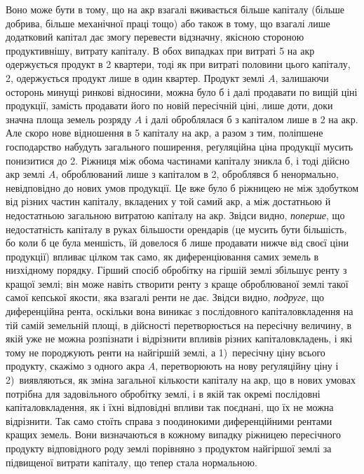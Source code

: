 \parcont{}  %
Воно може бути в тому, що на акр взагалі вживається більше капіталу (більше
добрива, більше механічної праці тощо) або також в тому, що взагалі лише
додатковий капітал дає змогу перевести відзначну, якісною стороною продуктивнішу,
витрату капіталу. В обох випадках при витраті 5 на акр одержується
продукт в 2  квартери, тоді як при витраті половини цього капіталу,
2, одержується продукт лише в один квартер. Продукт землі $A$,
залишаючи осторонь минущі ринкові відносини, можна було б і далі продавати
по вищій ціні продукції, замість продавати його по новій пересічній
ціні, лише доти, доки значна площа земель розряду $A$ і далі оброблялася б
з капіталом лише в 2 на акр. Але скоро нове відношення
в 5 капіталу на акр, а разом з тим, поліпшене господарство набудуть
загального поширення, реґуляційна ціна продукції мусить понизитися до 2. Ріжниця між обома частинами капіталу зникла б, і тоді дійсно акр землі $A$,
оброблюваний лише з капіталом в 2, оброблявся б ненормально,
невідповідно до нових умов продукції. Це вже було б ріжницею не між здобутком від
різних частин капіталу, вкладених у той самий акр, а між достатньою й недостатньою
загальною витратою капіталу на акр. Звідси видно, \emph{поперше}, що недостатність
капіталу в руках більшости орендарів (це мусить бути більшість, бо коли б це
була меншість, їй довелося б лише продавати нижче від своєї ціни продукції)
впливає цілком так само, як диференціювання самих земель в низхідному порядку.
Гірший спосіб обробітку на гіршій землі збільшує ренту з кращої землі;
він може навіть створити ренту з краще оброблюваної землі такої самої кепської
якости, яка взагалі ренти не дає. Звідси видно, \emph{подруге}, що диференційна рента,
оскільки вона виникає з послідовного капіталовкладення на тій самій земельній
площі, в дійсності перетворюється на пересічну величину, в якій уже не можна
розпізнати і відрізнити впливів різних капіталовкладень, і які тому не породжують
ренти на найгіршій землі, а 1)~пересічну ціну всього продукту, скажімо
з одного акра $A$, перетворюють на нову реґуляційну ціну і 2)~виявляються, як
зміна загальної кількости капіталу на акр, що в нових умовах потрібна для
задовільного обробітку землі, і в якій так окремі послідовні капіталовкладення, як і
їхні відповідні впливи так поєднані, що їх не можна відрізнити. Так само стоїть
справа з поодинокими диференційними рентами кращих земель. Вони визначаються
в кожному випадку ріжницею пересічного продукту відповідного роду землі порівняно
з продуктом найгіршої землі за підвищеної витрати капіталу, що тепер
стала нормальною.

